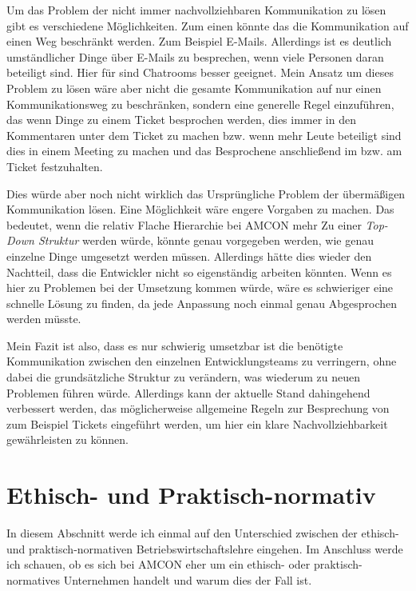         Um das Problem der nicht immer nachvollziehbaren Kommunikation zu lösen gibt es verschiedene Möglichkeiten. Zum
        einen könnte das die Kommunikation auf einen Weg beschränkt werden. Zum Beispiel E-Mails. Allerdings ist es 
        deutlich umständlicher Dinge über E-Mails zu besprechen, wenn viele Personen daran beteiligt sind. Hier für sind 
        Chatrooms besser geeignet. Mein Ansatz um dieses Problem zu lösen wäre aber nicht die gesamte Kommunikation auf 
        nur einen Kommunikationsweg zu beschränken, sondern eine generelle Regel einzuführen, das wenn Dinge zu einem 
        Ticket besprochen werden, dies immer in den Kommentaren unter dem Ticket zu machen bzw. wenn mehr Leute 
        beteiligt sind dies in einem Meeting zu machen und das Besprochene anschließend im bzw. am Ticket festzuhalten.

        Dies würde aber noch nicht wirklich das Ursprüngliche Problem der übermäßigen Kommunikation lösen. Eine 
        Möglichkeit wäre engere Vorgaben zu machen. Das bedeutet, wenn die relativ Flache Hierarchie bei AMCON mehr Zu
        einer \emph{Top-Down Struktur} werden würde, könnte genau vorgegeben werden, wie genau einzelne Dinge umgesetzt
        werden müssen. Allerdings hätte dies wieder den Nachtteil, dass die Entwickler nicht so eigenständig arbeiten 
        könnten. Wenn es hier zu Problemen bei der Umsetzung kommen würde, wäre es schwieriger eine schnelle Lösung
        zu finden, da jede Anpassung noch einmal genau Abgesprochen werden müsste.

        Mein Fazit ist also, dass es nur schwierig umsetzbar ist die benötigte Kommunikation zwischen den einzelnen
        Entwicklungsteams zu verringern, ohne dabei die grundsätzliche Struktur zu verändern, was wiederum zu neuen 
        Problemen führen würde. Allerdings kann der aktuelle Stand dahingehend verbessert werden, das möglicherweise
        allgemeine Regeln zur Besprechung von zum Beispiel Tickets eingeführt werden, um hier ein klare 
        Nachvollziehbarkeit gewährleisten zu können.

\section{Ethisch- und Praktisch-normativ}
    In diesem Abschnitt werde ich einmal auf den Unterschied zwischen der ethisch- und praktisch-normativen 
    Betriebswirtschaftslehre eingehen. Im Anschluss werde ich schauen, ob es sich bei AMCON eher um ein ethisch- oder 
    praktisch-normatives Unternehmen handelt und warum dies der Fall ist.

